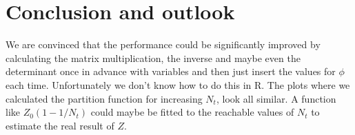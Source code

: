 \section{Conclusion and outlook}

We are convinced that the performance could be significantly improved by calculating the matrix multiplication, the inverse and maybe even the determinant once in advance with variables and then just insert the values for $\phi$ each time. Unfortunately we don't know how to do this in R.
The plots where we calculated the partition function for increasing $N_t$, look all similar. A function like $Z_0(1-1/N_t)$ could maybe be fitted to the reachable values of $N_t$ to estimate the real result of $Z$.
